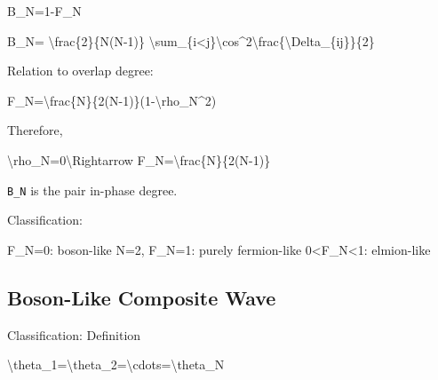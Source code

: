 \documentclass[
  a4paper]{article}
\newenvironment{Shaded}{}{}
\newcommand{\NormalTok}[1]{#1}
\begin{document}
\begin{Shaded}
\begin{Highlighting}[]
\NormalTok{B\_N=1{-}F\_N}
\end{Highlighting}
\end{Shaded}

\begin{Shaded}
\begin{Highlighting}[]
\NormalTok{B\_N=}
\NormalTok{\textbackslash{}frac\{2\}\{N(N{-}1)\}}
\NormalTok{\textbackslash{}sum\_\{i\textless{}j\}\textbackslash{}cos\^{}2\textbackslash{}frac\{\textbackslash{}Delta\_\{ij\}\}\{2\}}
\end{Highlighting}
\end{Shaded}

Relation to overlap degree:

\begin{Shaded}
\begin{Highlighting}[]
\NormalTok{F\_N=\textbackslash{}frac\{N\}\{2(N{-}1)\}(1{-}\textbackslash{}rho\_N\^{}2)}
\end{Highlighting}
\end{Shaded}

Therefore,

\begin{Shaded}
\begin{Highlighting}[]
\NormalTok{\textbackslash{}rho\_N=0\textbackslash{}Rightarrow F\_N=\textbackslash{}frac\{N\}\{2(N{-}1)\}}
\end{Highlighting}
\end{Shaded}

\texttt{B\_N} is the pair in-phase degree.

Classification:

\begin{Shaded}
\begin{Highlighting}[]
\NormalTok{F\_N=0: boson{-}like}
\NormalTok{N=2, F\_N=1: purely fermion{-}like}
\NormalTok{0\textless{}F\_N\textless{}1: elmion{-}like}
\end{Highlighting}
\end{Shaded}

\subsection{Boson-Like Composite Wave}\label{boson-like-composite-wave}

Classification: Definition

\begin{Shaded}
\begin{Highlighting}[]
\NormalTok{\textbackslash{}theta\_1=\textbackslash{}theta\_2=\textbackslash{}cdots=\textbackslash{}theta\_N}
\end{Highlighting}
\end{Shaded}
\end{document}
